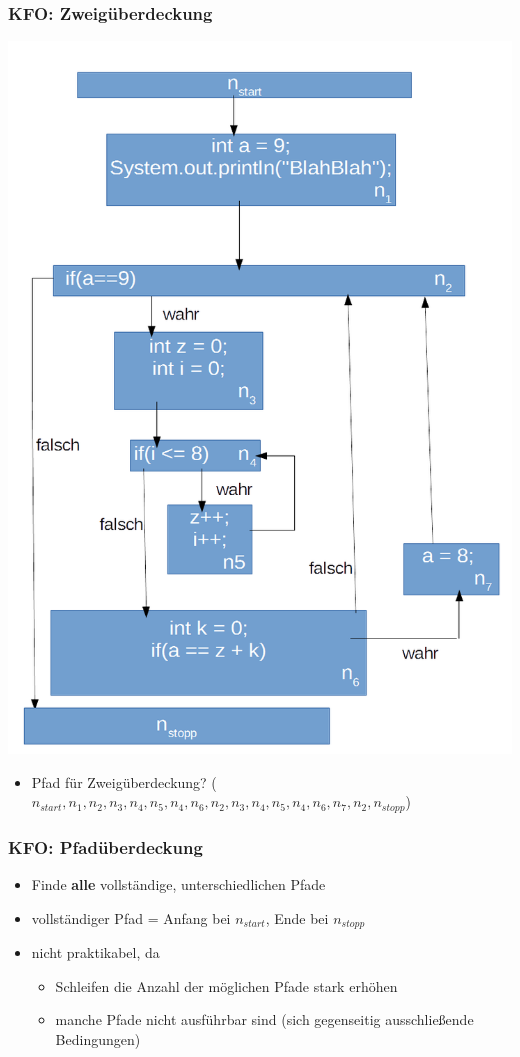 \documentclass[18pt]{beamer}
\begin{document}
	\begin{frame}
		\frametitle{KFO: Zweigüberdeckung}
		\centering \includegraphics[scale=0.2]{./pics/tut5/test-without-goto.png}
		\begin{itemize}
			\item Pfad für Zweigüberdeckung? \pause ($n_{start}, n_1, n_2, n_3, n_4, n_5, n_4, n_6, n_2, n_3, n_4, n_5, n_4, n_6, n_7, n_2, n_{stopp}$) 
		\end{itemize}
	\end{frame}

	\begin{frame}
		\frametitle{KFO: Pfadüberdeckung}
		\begin{itemize}
			\item Finde \textbf{alle} vollständige, unterschiedlichen Pfade \pause
			\item vollständiger Pfad = Anfang bei $n_{start}$, Ende bei $n_{stopp}$ \pause
			\item nicht praktikabel, da 
			\begin{itemize}
				\item Schleifen die Anzahl der möglichen Pfade stark erhöhen \pause
				\item manche Pfade nicht ausführbar sind (sich gegenseitig ausschließende Bedingungen) \pause
			\end{itemize}
		\end{itemize}
	\end{frame}
\end{document}
